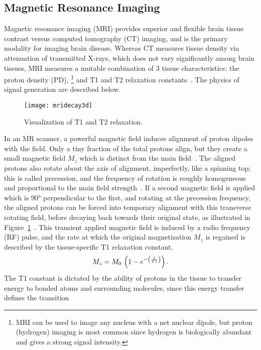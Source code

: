 \subsection{Magnetic Resonance Imaging}\label{ss:mri}
Magnetic resonance imaging (MRI) provides superior and flexible brain tissue contrast
versus computed tomography (CT) imaging, and is the primary modality for imaging brain disease.
Whereas CT measures tissue density via attenuation of transmitted X-rays,
which does not vary significantly among brain tissues,
MRI measures a mutable combination of 3 tissue characteristics: the proton density (PD),%
\footnote{MRI can be used to image any nucleus with a net nuclear dipole,
  but proton (hydrogen) imaging is most common since hydrogen is biologically abundant
  and gives a strong signal intensity.}
and T1 and T2 relaxation constants~\cite{Pooley2005}.
The physics of signal generation are described below.
\par
\begin{figure}[b]
  \centering\texttt{[image: mridecay3d]}
  \caption{Visualization of T1 and T2 relaxation.}%
  \label{fig:mridecay3d}
\end{figure}
In an MR scanner, a powerful magnetic field induces alignment of proton dipoles with the field.
Only a tiny fraction of the total protons align,
but they create a small magnetic field $M_z$ which is distinct from the main field~\cite{Bloch1946}.
The aligned protons also rotate about the axis of alignment, imperfectly, like a spinning top;
this is called precession, and the frequency of rotation is roughly homogeneous and proportional
to the main field strength~\cite{Bloch1946}.
If a second magnetic field is applied which is \ang{90} perpendicular to the first,
and rotating at the precession frequency, the aligned protons can be forced into
temporary alignment with this transverse rotating field, before decaying
back towards their original state, as illustrated in Figure~\ref{fig:mridecay3d}~\cite{Bloch1946}.
This transient applied magnetic field is induced by a radio frequency (RF) pulse,
and the rate at which the original magnetization $M_z$ is regained is described by
the tissue-specific T1 relaxation constant,
\begin{equation}
  M_z = M_0\et\left(1-e^{-\left(\frac{t}{T1}\right)}\right).%
  \label{eq:T1}
\end{equation}
The T1 constant is dictated by the ability of protons in the tissue to transfer energy
to bonded atoms and surrounding molecules, since this energy transfer defines the transition
